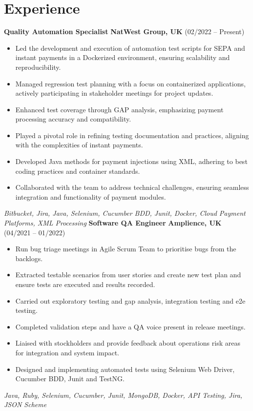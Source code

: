 \documentclass[11pt,a4paper,sans]{moderncv}
\begin{document}
    \section{Experience}
    \noindent \textbf{Quality Automation Specialist} \hfill \textbf{NatWest Group, UK}  (02/2022 – Present) \\
    \begin{itemize}
        \item Led the development and execution of automation test scripts for SEPA and instant payments in a Dockerized environment, ensuring scalability and reproducibility.
        \item Managed regression test planning with a focus on containerized applications, actively participating in stakeholder meetings for project updates.
        \item Enhanced test coverage through GAP analysis, emphasizing payment processing accuracy and compatibility.
        \item Played a pivotal role in refining testing documentation and practices, aligning with the complexities of instant payments.
        \item Developed Java methods for payment injections using XML, adhering to best coding practices and container standards.
        \item Collaborated with the team to address technical challenges, ensuring seamless integration and functionality of payment modules.
    \end{itemize}
    \small \textit{Bitbucket, Jira, Java, Selenium, Cucumber BDD, Junit, Docker, Cloud Payment Platforms, XML Processing}
    \noindent \textbf{Software QA Engineer} \hfill \textbf{Amplience, UK} (04/2021 – 01/2022) \\
    \begin{itemize}
        \item Run bug triage meetings in Agile Scrum Team to prioritise bugs from the backlogs.
        \item Extracted testable scenarios from user stories and create new test plan and ensure tests are executed and results recorded.
        \item Carried out exploratory testing and gap analysis, integration testing and e2e testing.
        \item Completed validation steps and have a QA voice present in release meetings.
        \item Liaised with stockholders and provide feedback about operations risk areas for integration and system impact.
        \item Designed and implementing automated tests using Selenium Web Driver, Cucumber BDD, Junit and TestNG.
    \end{itemize}
    \small \textit{Java, Ruby, Selenium, Cucumber, Junit, MongoDB, Docker, API Testing, Jira, JSON Scheme}
\end{document}
